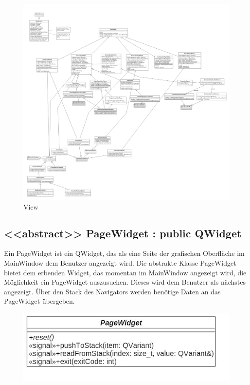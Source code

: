 \begin{figure}[H]
\includegraphics[width=1\linewidth]{img/Klassendiagramm/View}
\caption{View}
\label{fig:view}
\end{figure}


\subsection*{<<abstract>> PageWidget : public QWidget}
Ein PageWidget ist ein QWidget, das als eine Seite der grafischen Oberfläche im MainWindow dem Benutzer angezeigt wird. Die abstrakte Klasse PageWidget bietet dem erbenden Widget, das momentan im MainWindow angezeigt wird, die Möglichkeit ein PageWidget auszusuchen. Dieses wird dem Benutzer als nächstes angezeigt. Über den Stack des Navigators werden benötige Daten an das PageWidget übergeben.

\begin{figure}[H]
	\centering
	\includegraphics[scale=0.5]{img/Klassendiagramm/Klassen/View/PageWidget}
	\label{fig:pageWidget}
\end{figure}

